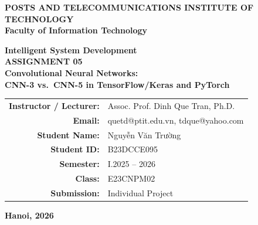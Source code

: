 \documentclass[11pt, a4paper]{article}
\begin{document}
\begin{titlepage}
\begin{center}

\vspace*{0.5cm}

\Large
\textbf{POSTS AND TELECOMMUNICATIONS INSTITUTE OF TECHNOLOGY}\\
\textbf{Faculty of Information Technology}

\vspace{2.0cm}

\Huge
\textbf{Intelligent System Development}\\
\vspace{0.4cm}
\LARGE
\textbf{ASSIGNMENT 05}\\
\vspace{0.6cm}
\Large
\textbf{Convolutional Neural Networks:\\CNN-3 vs.\ CNN-5 in TensorFlow/Keras and PyTorch}

\vspace{1.2cm}

\vfill

\normalsize
\begin{tabular}{rl}
\textbf{Instructor / Lecturer:} & Assoc. Prof. Dinh Que Tran, Ph.D. \\
\textbf{Email:} & quetd@ptit.edu.vn, tdque@yahoo.com \\[0.8cm]
\textbf{Student Name:} & Nguyễn Văn Trường \\
\textbf{Student ID:} & B23DCCE095 \\
\textbf{Semester:} & I.2025 -- 2026 \\
\textbf{Class:} & E23CNPM02 \\
\textbf{Submission:} & Individual Project \\
\end{tabular}

\vfill

\textbf{Hanoi, 2026}

\vspace{0.5cm}

\end{center}
\end{titlepage}

\tableofcontents
\newpage
\end{document}
